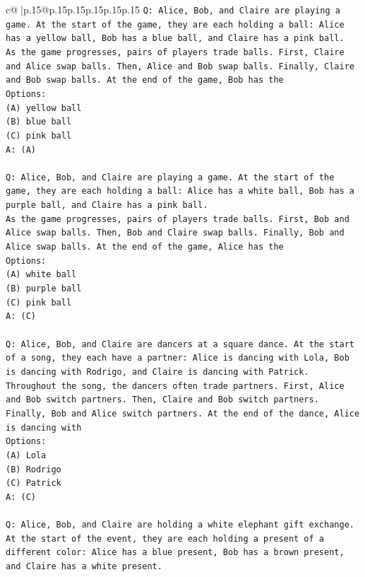 \documentclass{article}
\begin{document}
{\begin{supertabular}{c@{$\;$}|p{.15\linewidth}@{}p{.15\linewidth}p{.15\linewidth}p{.15\linewidth}p{.15\linewidth}p{.15\linewidth}}
{{{\texttt{Q: Alice, Bob, and Claire are playing a game. At the start of the game, they are each holding a ball: Alice has a yellow ball, Bob has a blue ball, and Claire has a pink ball.} \\
\texttt{As the game progresses, pairs of players trade balls. First, Claire and Alice swap balls. Then, Alice and Bob swap balls. Finally, Claire and Bob swap balls. At the end of the game, Bob has the} \\
\texttt{Options:} \\
\texttt{(A) yellow ball} \\
\texttt{(B) blue ball} \\
\texttt{(C) pink ball} \\
\texttt{A: (A)} \\
\\ 
\texttt{Q: Alice, Bob, and Claire are playing a game. At the start of the game, they are each holding a ball: Alice has a white ball, Bob has a purple ball, and Claire has a pink ball.} \\
\texttt{As the game progresses, pairs of players trade balls. First, Bob and Alice swap balls. Then, Bob and Claire swap balls. Finally, Bob and Alice swap balls. At the end of the game, Alice has the} \\
\texttt{Options:} \\
\texttt{(A) white ball} \\
\texttt{(B) purple ball} \\
\texttt{(C) pink ball} \\
\texttt{A: (C)} \\
\\ 
\texttt{Q: Alice, Bob, and Claire are dancers at a square dance. At the start of a song, they each have a partner: Alice is dancing with Lola, Bob is dancing with Rodrigo, and Claire is dancing with Patrick.} \\
\texttt{Throughout the song, the dancers often trade partners. First, Alice and Bob switch partners. Then, Claire and Bob switch partners. Finally, Bob and Alice switch partners. At the end of the dance, Alice is dancing with} \\
\texttt{Options:} \\
\texttt{(A) Lola} \\
\texttt{(B) Rodrigo} \\
\texttt{(C) Patrick} \\
\texttt{A: (C)} \\
\\ 
\texttt{Q: Alice, Bob, and Claire are holding a white elephant gift exchange. At the start of the event, they are each holding a present of a different color: Alice has a blue present, Bob has a brown present, and Claire has a white present.} \\
}}}
\end{supertabular}}
\end{document}
